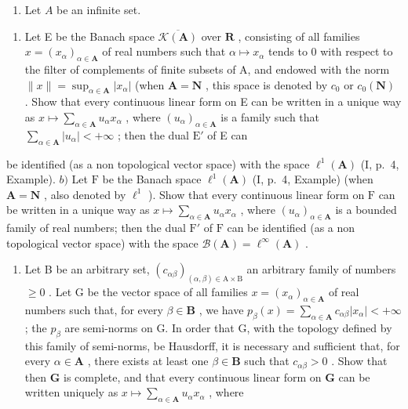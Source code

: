\exercisegroup

\begin{enumerate}
\def\labelenumi{\arabic{enumi})}
\tightlist
\item
  Let \(A\) be an infinite set.
\end{enumerate}

\begin{enumerate}
\def\labelenumi{\alph{enumi})}
\tightlist
\item
  Let E be the Banach space \(\overline{\mathcal{K}(\mathbf{A})}\) over \(\mathbf{R}\) , consisting of all families \(x = (x_{\alpha})_{\alpha \in \mathbf{A}}\) of real numbers such that \(\alpha \mapsto x_{\alpha}\) tends to 0 with respect to the filter of complements of finite subsets of A, and endowed with the norm \(\| x\| = \sup_{\alpha \in \mathbf{A}}|x_{\alpha}|\) (when \(\mathbf{A} = \mathbf{N}\) , this space is denoted by \(c_0\) or \(c_0(\mathbf{N})\) . Show that every continuous linear form on E can be written in a unique way as \(x \mapsto \sum_{\alpha \in \mathbf{A}} u_{\alpha} x_{\alpha}\) , where \((u_{\alpha})_{\alpha \in \mathbf{A}}\) is a family such that \(\sum_{\alpha \in \mathbf{A}} |u_{\alpha}| < +\infty\) ; then the dual \(\mathrm{E}'\) of E can
\end{enumerate}

be identified (as a non topological vector space) with the space \(\ell^1 (\mathbf{A})\) (I, p.~4, Example). \(b)\) Let \(\mathrm{F}\) be the Banach space \(\ell^1 (\mathbf{A})\) (I, p.~4, Example) (when \(\mathbf{A} = \mathbf{N}\) , also denoted by \(\ell^1\) ). Show that every continuous linear form on \(\mathrm{F}\) can be written in a unique way as \(x\mapsto \sum_{\alpha \in \mathbf{A}}u_{\alpha}x_{\alpha}\) , where \((u_{\alpha})_{\alpha \in \mathbf{A}}\) is a bounded family of real numbers; then the dual \(\mathrm{F}'\) of \(\mathrm{F}\) can be identified (as a non topological vector space) with the space \(\mathcal{B}(\mathbf{A}) = \ell^{\infty}(\mathbf{A})\) .

\begin{enumerate}
\def\labelenumi{\alph{enumi})}
\setcounter{enumi}{2}
\tightlist
\item
  Let B be an arbitrary set, \((c_{\alpha \beta})_{(\alpha ,\beta)\in \mathrm{A}\times \mathrm{B}}\) an arbitrary family of numbers \(\geqslant 0\) . Let G be the vector space of all families \(x = (x_{\alpha})_{\alpha \in \mathbf{A}}\) of real numbers such that, for every \(\beta \in \mathbf{B}\) , we have \(p_{\beta}(x) = \sum_{\alpha \in \mathbf{A}}c_{\alpha \beta}|x_{\alpha}| < + \infty\) ; the \(p_{\beta}\) are semi-norms on G. In order that G, with the topology defined by this family of semi-norms, be Hausdorff, it is necessary and sufficient that, for every \(\alpha \in \mathbf{A}\) , there exists at least one \(\beta \in \mathbf{B}\) such that \(c_{\alpha \beta} > 0\) . Show that then \(\mathbf{G}\) is complete, and that every continuous linear form on \(\mathbf{G}\) can be written uniquely as \(x \mapsto \sum_{\alpha \in \mathbf{A}} u_{\alpha} x_{\alpha}\) , where
\end{enumerate}

